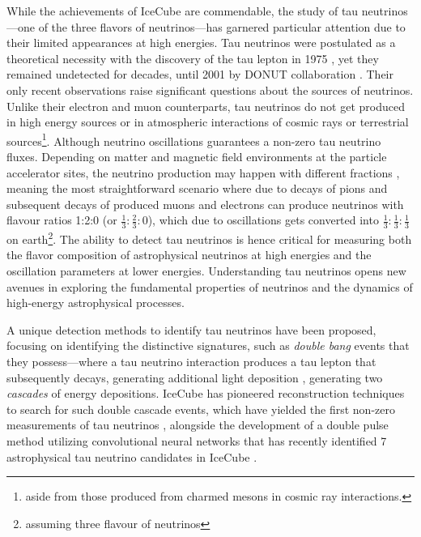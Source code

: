 While the achievements of IceCube are commendable, the study of tau neutrinos—one of the three flavors of neutrinos—has garnered particular attention due to their limited appearances at high energies. Tau neutrinos were postulated as a theoretical necessity with the discovery of the tau lepton in 1975 , yet they remained undetected for decades, until 2001 by DONUT collaboration . Their only recent observations raise significant questions about the sources of neutrinos. Unlike their electron and muon counterparts, tau neutrinos do not get produced in high energy sources or in atmospheric interactions of cosmic rays or terrestrial sources\footnote{aside from those produced from charmed mesons in cosmic ray interactions.}. Although neutrino oscillations guarantees a non-zero tau neutrino fluxes. Depending on matter and magnetic field environments at the particle accelerator sites, the neutrino production may happen with different fractions , meaning the most straightforward scenario where due to decays of pions and subsequent decays of produced muons and electrons can produce neutrinos with flavour ratios 1:2:0 (or $\frac{1}{3}:\frac{2}{3}:0$), which due to oscillations gets converted into $\frac{1}{3}:\frac{1}{3}:\frac{1}{3}$ on earth\footnote{assuming three flavour of neutrinos}. The ability to detect tau neutrinos is hence critical for measuring both the flavor composition of astrophysical neutrinos at high energies and the oscillation parameters at lower energies. Understanding tau neutrinos opens new avenues in exploring the fundamental properties of neutrinos and the dynamics of high-energy astrophysical processes.

A unique detection methods to identify tau neutrinos have been proposed, focusing on identifying the distinctive signatures, such as \emph{double bang} events that they possess—where a tau neutrino interaction produces a tau lepton that subsequently decays, generating additional light deposition , generating two \emph{cascades} of energy depositions. IceCube has pioneered reconstruction techniques to search for such double cascade events, which have yielded the first non-zero measurements of tau neutrinos , alongside the development of a double pulse method utilizing convolutional neural networks that has recently identified 7 astrophysical tau neutrino candidates in IceCube . 

